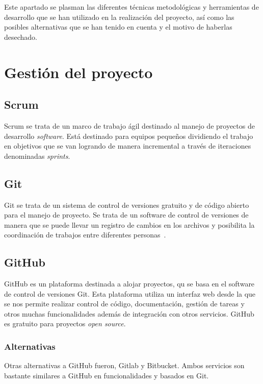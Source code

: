 
Este apartado se plasman las diferentes técnicas metodológicas y herramientas de desarrollo que se han utilizado en la realización del proyecto, así como las posibles alternativas que se han tenido en cuenta y el motivo de haberlas desechado.

\section{Gestión del proyecto}\label{GesProyecto}
\subsection{Scrum}\label{Scrum}
Scrum se trata de un marco de trabajo ágil destinado al manejo de proyectos de desarrollo \emph{software}. Está destinado para equipos pequeños dividiendo el trabajo en objetivos que se van logrando de manera incremental a través de iteraciones denominadas \emph{sprints}. \cite{wiki:scrm}

\subsection{Git}\label{Git}
Git se trata de un sistema de control de versiones gratuito y de código abierto para el manejo de proyecto. Se trata de un software de control de versiones de manera que se puede llevar un registro de cambios en los archivos y posibilita la coordinación de trabajos entre diferentes personas~\cite{git_1,git_2}.

\subsection{GitHub}\label{GitHub}
GitHub es un plataforma destinada a alojar proyectos, qu se basa en el software de control de versiones Git. Esta plataforma utiliza un interfaz web desde la que se nos permite realizar control de código, documentación, gestión de tareas y otros muchas funcionalidades además de integración con otros servicios. GitHub es gratuito para proyectos \emph{open source}. \cite{wiki:github_wiki,github}

\subsubsection{Alternativas}\label{AlternativasGitHub}
Otras alternativas a GitHub fueron, Gitlab y Bitbucket. Ambos servicios son bastante similares a GitHub en funcionalidades y basados en Git.

